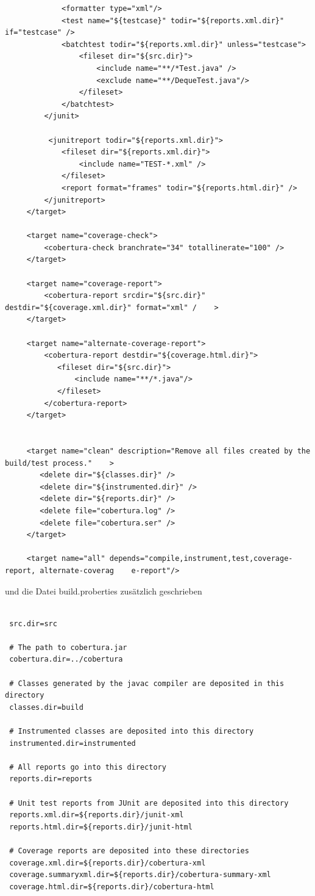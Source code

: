 \documentclass[a4paper,11pt]{scrartcl}
\begin{document}
\begin{lstlisting}
             <formatter type="xml"/>
             <test name="${testcase}" todir="${reports.xml.dir}" if="testcase" />            
             <batchtest todir="${reports.xml.dir}" unless="testcase">
                 <fileset dir="${src.dir}">
                     <include name="**/*Test.java" />
                     <exclude name="**/DequeTest.java"/>
                 </fileset>
             </batchtest>
         </junit>
 
          <junitreport todir="${reports.xml.dir}">
             <fileset dir="${reports.xml.dir}">
                 <include name="TEST-*.xml" />
             </fileset>
             <report format="frames" todir="${reports.html.dir}" />
         </junitreport>
     </target>
 
     <target name="coverage-check">
         <cobertura-check branchrate="34" totallinerate="100" />
     </target>
 
     <target name="coverage-report">
         <cobertura-report srcdir="${src.dir}" destdir="${coverage.xml.dir}" format="xml" /    >
     </target>
 
     <target name="alternate-coverage-report">
         <cobertura-report destdir="${coverage.html.dir}">
            <fileset dir="${src.dir}">
                <include name="**/*.java"/>
            </fileset>
         </cobertura-report>
     </target>
 
 
     <target name="clean" description="Remove all files created by the build/test process."    >
        <delete dir="${classes.dir}" />
        <delete dir="${instrumented.dir}" />
        <delete dir="${reports.dir}" />
        <delete file="cobertura.log" />
        <delete file="cobertura.ser" />
     </target>
 
     <target name="all" depends="compile,instrument,test,coverage-report, alternate-coverag    e-report"/>
\end{lstlisting} 
und die Datei build.proberties zusätzlich geschrieben
\begin{lstlisting}

 src.dir=src
 
 # The path to cobertura.jar
 cobertura.dir=../cobertura
 
 # Classes generated by the javac compiler are deposited in this directory
 classes.dir=build
 
 # Instrumented classes are deposited into this directory
 instrumented.dir=instrumented
 
 # All reports go into this directory
 reports.dir=reports
 
 # Unit test reports from JUnit are deposited into this directory
 reports.xml.dir=${reports.dir}/junit-xml
 reports.html.dir=${reports.dir}/junit-html
 
 # Coverage reports are deposited into these directories
 coverage.xml.dir=${reports.dir}/cobertura-xml
 coverage.summaryxml.dir=${reports.dir}/cobertura-summary-xml
 coverage.html.dir=${reports.dir}/cobertura-html

\end{lstlisting}
\end{document}
